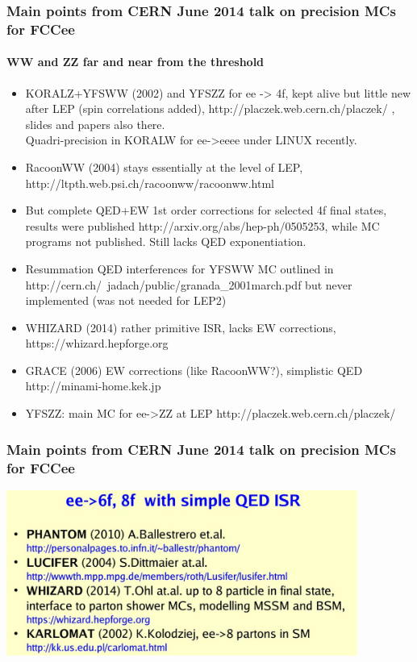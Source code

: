 \documentclass{beamer}
\newcommand{\crd}{\color{red}}
\newcommand{\ns}{\normalsize}
\begin{document}
\begin{frame}[fragile]
\frametitle{\bf\ns 
 Main points from CERN June 2014 talk on precision MCs for FCCee}
\framesubtitle{\large\bf\crd WW and ZZ far and near from the threshold}

\vspace{-2mm}
\footnotesize
\begin{itemize}
\item
KORALZ+YFSWW (2002) and YFSZZ for ee -> 4f,
kept alive but little new after LEP (spin correlations added), http://placzek.web.cern.ch/placzek/ , slides and papers also there.\\
Quadri-precision in KORALW for ee->eeee under LINUX recently.
\item
RacoonWW (2004) stays essentially at the level of LEP, http://ltpth.web.psi.ch/racoonww/racoonww.html
\item
But complete QED+EW 1st order corrections for selected 4f final states,
results were published http://arxiv.org/abs/hep-ph/0505253,
while MC programs not published.
Still lacks QED exponentiation.
\item
Resummation QED interferences for YFSWW MC outlined in http://cern.ch/~jadach/public/granada\_2001march.pdf
but never implemented (was not needed for LEP2)
\item
WHIZARD (2014) rather primitive ISR, lacks EW corrections, https://whizard.hepforge.org
\item
GRACE (2006) EW corrections (like RacoonWW?), simplistic QED http://minami-home.kek.jp
\item
YFSZZ: main MC for ee->ZZ at LEP http://placzek.web.cern.ch/placzek/
\end{itemize}
\end{frame}

% 

\begin{frame}[fragile]
\frametitle{\bf\ns 
 Main points from CERN June 2014 talk on precision MCs for FCCee}

\includegraphics[width=115mm]{./sli10.jpg}
\end{frame}
\end{document}
